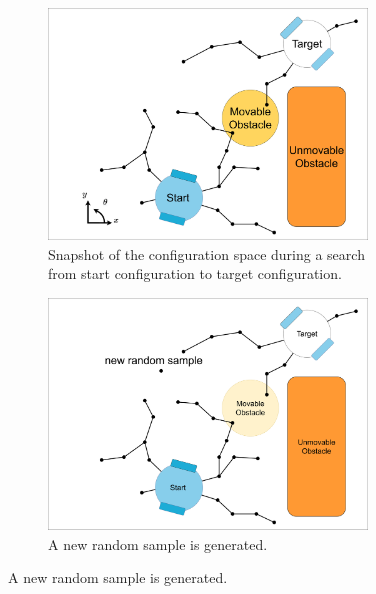 \begin{algorithm}[H]
\begin{algorithmic}[1]
{{{{}}


\EndWhile
}}
\end{algorithmic}
\end{algorithm}



\begin{figure}[H]
    \centering
    \begin{subfigure}{.49\textwidth}
    \centering
    \includegraphics[width=0.93\textwidth, cfbox=my_grey 5pt 0pt]{figures/mp/1mp_init.drawio.png}
    \caption{Snapshot of the configuration space during a search from start configuration to target configuration.}
    \end{subfigure}
    \begin{subfigure}{.49\textwidth}
    \centering
    \includegraphics[width=0.93\textwidth, cfbox=my_light_blue 5pt 0pt]{figures/mp/2mp_new_rand_sample.drawio.png}
    \caption{A new random sample is generated.\bs}
    \end{subfigure}


\end{figure}
